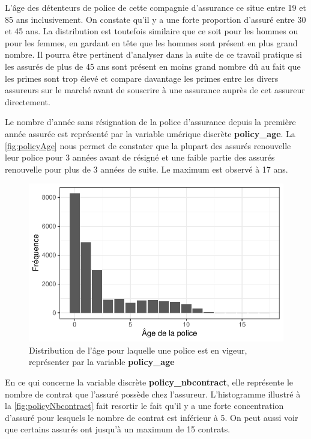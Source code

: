 \documentclass[
]{article}
\begin{document}
L'âge des détenteurs de police de cette compagnie d'assurance ce situe
entre 19 et 85 ans inclusivement. On constate qu'il y a une forte
proportion d'assuré entre 30 et 45 ans. La distribution est toutefois
similaire que ce soit pour les hommes ou pour les femmes, en gardant en
tête que les hommes sont présent en plus grand nombre. Il pourra être
pertinent d'analyser dans la suite de ce travail pratique si les assurés
de plus de 45 ans sont présent en moins grand nombre dû au fait que les
primes sont trop élevé et compare davantage les primes entre les divers
assureurs sur le marché avant de souscrire à une assurance auprès de cet
assureur directement.

Le nombre d'année sans résignation de la police d'assurance depuis la
première année assurée est représenté par la variable umérique discrète
\textbf{policy\_age}. La \autoref{fig:policyAge} nous permet de
constater que la plupart des assurés renouvelle leur police pour 3
années avant de résigné et une faible partie des assurés renouvelle pour
plus de 3 années de suite. Le maximum est observé à 17 ans.

\begin{figure}

{\centering \includegraphics{01-Rapport_files/figure-latex/graph_policy_age-1} 

}

\caption{\label{fig:policyAge}Distribution de l'âge pour laquelle une police est en vigeur, représenter par la variable \textbf{policy\_age}}\label{fig:graph_policy_age}
\end{figure}

En ce qui concerne la variable discrète \textbf{policy\_nbcontract},
elle représente le nombre de contrat que l'assuré possède chez
l'assureur. L'histogramme illustré à la \autoref{fig:policyNbcontract}
fait resortir le fait qu'il y a une forte concentration d'assuré pour
lesquels le nombre de contrat est inférieur à 5. On peut aussi voir que
certains assurés ont jusqu'à un maximum de 15 contrats.
\end{document}
